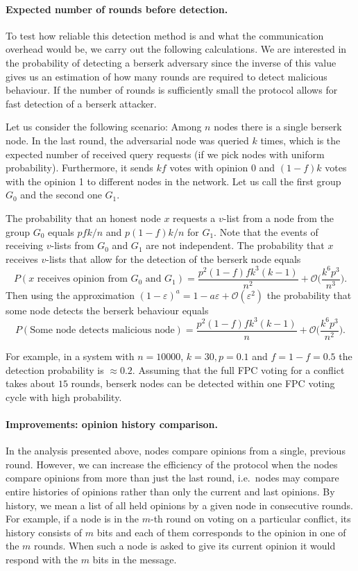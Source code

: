 \documentclass[../main.tex]{subfiles}
\begin{document}
\paragraph{ Expected number of rounds before detection.}

To test how reliable this detection method is and what the communication overhead would be, we carry out the following calculations.
We are interested in the probability of detecting a berserk adversary since the inverse of this value gives us an estimation of how many rounds are required to detect malicious behaviour. If the number of rounds is sufficiently small the protocol allows for fast detection of a berserk attacker. 




Let us consider the following scenario: Among $n$ nodes there is a single berserk node. In the last round, the adversarial node was queried $k$ times, which is the expected number of received query requests (if we pick nodes with uniform probability).  Furthermore, it sends $k f$ votes with opinion 0 and $(1-f) k$ votes with the opinion 1 to different nodes in the network. Let us call the first group $G_0$ and the second one $G_1$.

The probability that an honest node $x$ requests a $v$-list from a node from the group $G_0$ equals $pfk/n$ and $p(1-f)k/n$ for $G_1$. Note that the events of receiving $v$-lists from $G_0$ and $G_1$ are not independent. The probability that $x$ receives $v$-lists that allow for the detection of the berserk node equals
$$P(x {\text{ receives opinion from }} G_0 {\text{ and }} G_1)= \frac{p^2 (1-f)fk^3(k-1)}{n^2}+\mathcal{O}\Big(\frac{k^6p^3}{n^3}\Big).$$
Then using the approximation  $(1-\varepsilon)^a = 1-a\varepsilon + \mathcal{O}(\varepsilon^2)$ the probability that some node detects the berserk behaviour equals
\[
P({\text{Some node detects malicious node}}) = \frac{p^2 (1-f)fk^3(k-1)}{n}+\mathcal{O}\Big(\frac{k^6p^3}{n^2}\Big).
\]

For example, in a system with $n=10000$, $k=30,  p=0.1$ and  $f=1-f =0.5$ the detection probability is  $\approx 0.2$. Assuming that the full FPC voting for a conflict takes about $15$ rounds, berserk nodes can be detected within one FPC  voting cycle with high probability. 

\paragraph{Improvements: opinion history comparison.}
In the analysis presented above, nodes compare opinions from a single, previous round. However, we can increase the efficiency of the protocol when the nodes compare opinions from more than just the last round, i.e.~nodes may compare entire histories of opinions rather than only the current and last opinions. By history, we mean a list of all held opinions by a given node in consecutive rounds. For example, if a node is in the $m$-th round on voting on a particular conflict, its history consists of $m$ bits and each of them corresponds to the opinion in one of the $m$ rounds. When such a node is asked to give its current opinion it would respond with the $m$ bits in the message.  
\end{document}
